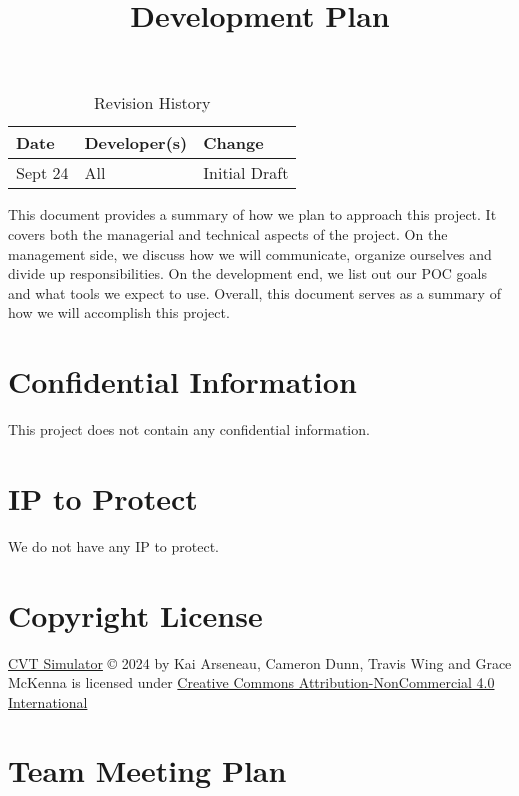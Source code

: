 \documentclass{article}
\title{Development Plan\\\progname}
\author{\authname}
\date{}
\begin{document}
\maketitle

\begin{table}[hp]
\caption{Revision History} \label{TblRevisionHistory}
\begin{tabularx}{\textwidth}{llX}
\toprule
\textbf{Date} & \textbf{Developer(s)} & \textbf{Change}\\
\midrule
Sept 24 & All & Initial Draft\\
\bottomrule
\end{tabularx}
\end{table}

\newpage{}

This document provides a summary of how we plan to approach this project.
It covers both the managerial and technical aspects of the project.
On the management side, we discuss how we will communicate, organize ourselves and divide up responsibilities.
On the development end, we list out our POC goals and what tools we expect to use.
Overall, this document serves as a summary of how we will accomplish this project.

\section{Confidential Information}

This project does not contain any confidential information.

\section{IP to Protect}

We do not have any IP to protect.

\section{Copyright License}

\href{https://github.com/gr812b/CVT-Simulator}{CVT Simulator} © 2024 by 
Kai Arseneau, Cameron Dunn, Travis Wing and Grace McKenna is licensed under 
\href{https://creativecommons.org/licenses/by-nc/4.0/?ref=chooser-v1}{Creative Commons Attribution-NonCommercial 4.0 International}

\section{Team Meeting Plan}
\end{document}
